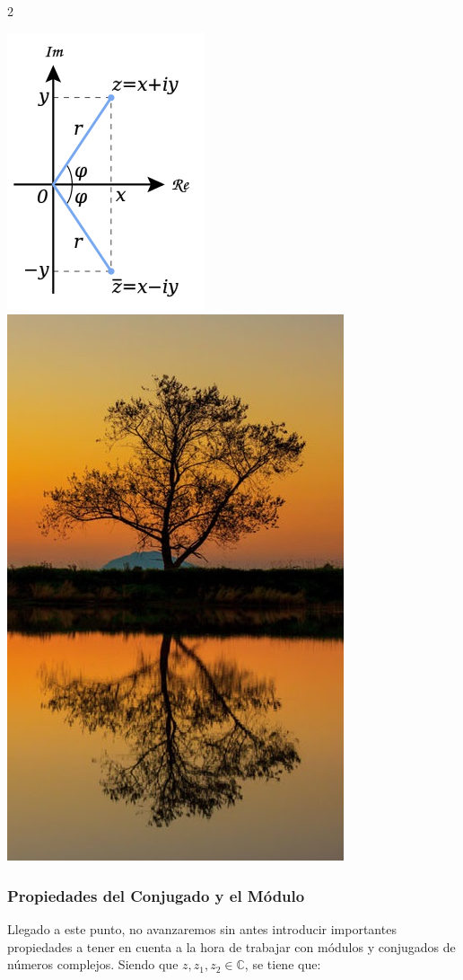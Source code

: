 \documentclass[12pt]{article}
\theoremstyle{definition}
\begin{document}
 \begin{multicols} {2}
	\begin{center} 
	 	\includegraphics[scale=0.6]{conjugado.png}
	 	\includegraphics[scale=0.4]{tree.jpg}
 	\end{center}
 \end{multicols}

\subsubsection{Propiedades del Conjugado y el M\'odulo}
Llegado a este punto, no avanzaremos sin antes introducir importantes propiedades a tener en cuenta a la hora de trabajar con m\'odulos y conjugados de n\'umeros complejos. Siendo que $z, z_1, z_2 \in \mathbb{C}$, se tiene que:
\end{document}
